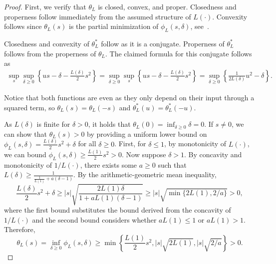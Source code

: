 \documentclass[11pt, hidelinks]{article}
\numberwithin{equation}{section}
\theoremstyle{thmstyletwo}%
\numberwithin{equation}{section}
\begin{document}
\begin{proof}
First, we verify that $\theta_L$ is closed, convex, and proper. Closedness and properness follow immediately from the assumed structure of $L(\cdot)$. Convexity follows since $\theta_L(s)$ is the partial minimization of $\phi_L(s,\delta)$, see~\cite[Theorem 5.3]{rockafeller}.

Closedness and convexity of $\theta_L^*$ follow as it is a conjugate. Properness of $\theta_L^*$ follows from the properness of $\theta_L$. The claimed formula for this conjugate follows as
\begin{align*}
  \sup_s \sup_{\delta \geq 0}\left\{ us - \delta - \frac{L(\delta)}{2}s^2\right\}= \sup_{\delta \geq 0} \sup_s \left\{ us - \delta - \frac{L(\delta)}{2}s^2\right\}= \sup_{\delta \geq 0} \left\{\frac{1}{2L(\delta)}u^2-\delta\right\}.
\end{align*}

Notice that both functions are even as they only depend on their input through a squared term, so $\theta_L(s) = \theta_L(-s)$ and $\theta_L^*(u)=\theta_L^*(-u)$. 


As $L(\delta)$ is finite for $\delta > 0$, it holds that $\theta_L(0)=\inf_{\delta \geq 0} \delta = 0$. If $s \ne 0$, we can  show that $\theta_L(s) > 0$ by providing a uniform lower bound on $\phi_L(s,\delta) = \tfrac{L(\delta)}{2} s^2 + \delta$ for all $\delta \geq 0$. First, for $\delta \leq 1$, by monotonicity of $L(\cdot)$, we can bound $\phi_L(s,\delta) \geq \frac{L(1)}{2}s^2 > 0$.
Now suppose  $\delta > 1$. By concavity and monotonicity of $1/L(\cdot)$, there exists some $a \geq 0$ such that $L(\delta) \geq \frac{1}{\frac{1}{L(1)}+a(\delta-1)}$. By the arithmetic-geometric mean inequality, $$\frac{L(\delta)}{2}s^2+\delta \geq |s|\sqrt{\frac{2L(1)\delta}{1+aL(1)(\delta-1)}} \geq |s|\sqrt{\min\{2L(1), 2/a\}} > 0,$$
where the first bound substitutes the bound derived from the concavity of $1/L(\cdot)$ and the second bound considers whether $aL(1) \leq 1$ or $aL(1) > 1$. Therefore,
$$\theta_L(s) = \inf_{\delta\geq 0} \phi_L(s,\delta) \geq \min\left\{\frac{L(1)}{2}s^2, |s|\sqrt{2L(1)}, |s| \sqrt{2/a}\right\} > 0. $$



\end{proof}
\end{document}
